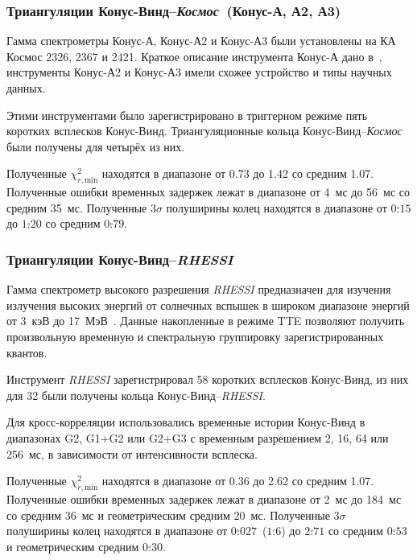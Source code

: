 \subsubsection{Триангуляции Конус-Винд--\textit{Космос}~(Конус-А, А2, А3)}
Гамма спектрометры Конус-А, Конус-А2 и Конус-А3 были установлены на КА 
Космос 2326, 2367 и 2421. Краткое описание инструмента Конус-А дано в~\citep{Aptekar_1998ApJ}, 
инструменты Конус-А2 и Конус-А3 имели схожее устройство и типы научных данных.

Этими инструментами было зарегистрировано в триггерном режиме пять коротких 
всплесков Конус-Винд. Триангуляционные кольца Конус-Винд--\textit{Космос} были 
получены для четырёх из них.

Полученные $\chi^2_{r,\textrm{min}}$ находятся в диапазоне от 0.73 до 1.42 со средним 1.07. 
Полученные ошибки временных задержек лежат в диапазоне от 4~мс до 56~мс со средним 35~мс. 
Полученные $3\sigma$ полуширины колец находятся в диапазоне от $0\overset{\circ}{.}15$ 
до $1\overset{\circ}{.}20$ со средним $0\overset{\circ}{.}79$.

\subsubsection{Триангуляции Конус-Винд--\textit{RHESSI}}
Гамма спектрометр высокого разрешения \textit{RHESSI} предназначен для изучения 
излучения высоких энергий от солнечных вспышек в широком диапазоне энергий 
от 3~кэВ до 17~МэВ~\citep{Lin_2002SoPh, Smith_2002SoPh}. Данные накопленные в режиме TTE 
позволяют получить произвольную временную и спектральную группировку зарегистрированных квантов.

Инструмент \textit{RHESSI} зарегистрировал 58 коротких всплесков Конус-Винд, из 
них для 32 были получены кольца Конус-Винд--\textit{RHESSI}.

Для кросс-корреляции использовались временные истории Конус-Винд 
в диапазонах G2, G1+G2 или G2+G3 с временным разрешением 2, 16, 64 или 256~мс, 
в зависимости от интенсивности всплеска.

Полученные $\chi^2_{r,\textrm{min}}$ находятся в диапазоне от 0.36 до 2.62 со 
средним 1.07. Полученные ошибки временных задержек лежат в диапазоне от 2~мс 
до 184~мс со средним 36~мс и геометрическим средним 20~мс. Полученные $3\sigma$ 
полуширины колец находятся в диапазоне от $0\overset{\circ}{.}027$~($1\overset{\prime}{.}6$) 
до $2\overset{\circ}{.}71$ со средним $0\overset{\circ}{.}53$ 
и геометрическим средним $0\overset{\circ}{.}30$.

